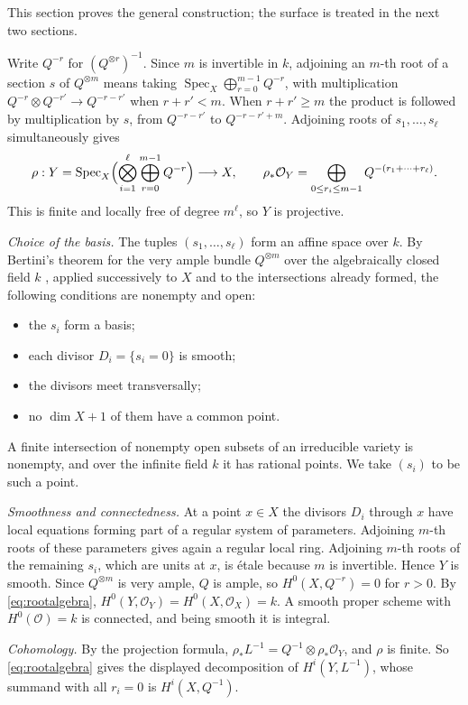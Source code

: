 \documentclass[11pt,a4paper]{article}
\theoremstyle{plain}
\theoremstyle{remark}
\newcommand{\OO}{\mathcal O}
\newcommand{\Spec}{\operatorname{Spec}}
\begin{document}
This section proves the general construction; the surface is treated in the next two sections.

Write $Q^{-r}$ for $(Q^{\otimes r})^{-1}$. Since $m$ is invertible in $k$, adjoining an $m$-th root of a section $s$ of
$Q^{\otimes m}$ means taking $\Spec_X\bigoplus_{r=0}^{m-1}Q^{-r}$, with multiplication
$Q^{-r}\otimes Q^{-r'}\to Q^{-r-r'}$ when $r+r'<m$. When $r+r'\ge m$ the product is followed by multiplication by $s$,
from $Q^{-r-r'}$ to $Q^{-r-r'+m}$. Adjoining roots of $s_1,\dots,s_\ell$ simultaneously gives
\begin{equation}\label{eq:rootalgebra}
 \rho:Y=\Spec_X\Bigl(\bigotimes_{i=1}^\ell\bigoplus_{r=0}^{m-1}Q^{-r}\Bigr)\longrightarrow X,\qquad
 \rho_*\OO_Y=\bigoplus_{0\le r_i\le m-1}Q^{-(r_1+\cdots+r_\ell)} .
\end{equation}
This is finite and locally free of degree $m^\ell$, so $Y$ is projective.

\emph{Choice of the basis.} The tuples $(s_1,\dots,s_\ell)$ form an affine space over $k$. By Bertini's theorem for the
very ample bundle $Q^{\otimes m}$ over the algebraically closed field $k$ \cite[II.8.18]{Hartshorne}, applied
successively to $X$ and to the intersections already formed, the following conditions are nonempty and open:
\begin{itemize}
\item the $s_i$ form a basis;
\item each divisor $D_i=\{s_i=0\}$ is smooth;
\item the divisors meet transversally;
\item no $\dim X+1$ of them have a common point.
\end{itemize}
A finite intersection of nonempty open subsets of an irreducible variety is nonempty, and over the infinite field $k$
it has rational points. We take $(s_i)$ to be such a point.

\emph{Smoothness and connectedness.} At a point $x\in X$ the divisors $D_i$ through $x$ have local equations forming
part of a regular system of parameters. Adjoining $m$-th roots of these parameters gives again a regular local ring.
Adjoining $m$-th roots of the remaining $s_i$, which are units at $x$, is étale because $m$ is invertible. Hence $Y$ is
smooth. Since $Q^{\otimes m}$ is very ample, $Q$ is ample, so $H^0(X,Q^{-r})=0$ for $r>0$. By
\eqref{eq:rootalgebra}, $H^0(Y,\OO_Y)=H^0(X,\OO_X)=k$. A smooth proper scheme with $H^0(\OO)=k$ is connected, and
being smooth it is integral.

\emph{Cohomology.} By the projection formula, $\rho_*L^{-1}=Q^{-1}\otimes\rho_*\OO_Y$, and $\rho$ is finite. So
\eqref{eq:rootalgebra} gives the displayed decomposition of $H^i(Y,L^{-1})$, whose summand with all $r_i=0$ is
$H^i(X,Q^{-1})$.
\end{document}
